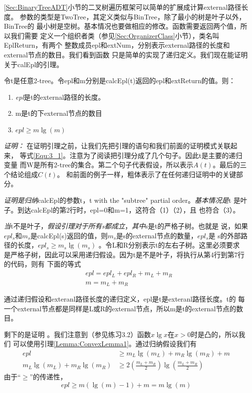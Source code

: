 \ref{Sec:BinaryTreeADT}小节的二叉树遍历框架可以简单的扩展成计算external路径长度。
参数的类型是TwoTree，其定义类似与BinTree，除了最小的树是叶子以外，BinTree的
最小树是空树。基本情况也要做相应的修改。函数需要返回两个值，所以我们需要
定义一个组织者类（参见\ref{Sec:OrganizerClass}小节），类名叫EplReturn，有两个
整数成员epl和extNum，分别表示external路径的长度和external节点的数目。我们看到函数
只是简单的实现了递归定义。我们现在能证明关于calEpl的引理。

\begin{lemma}\label{Lemma:ExternalNodeCount}
令t是任意2-tree。令epl和m分别是calcEpl(t)返回的epl和extReturn的值。则：
\begin{enumerate}
\item \emph{epl}是t的external路径的长度。
\item m是t的下external节点的数目
\item $epl \geq m\lg(m)$
\end{enumerate}

\emph{证明：} 在证明引理之前，让我们先把引理的语句和我们前面的证明模式关联起来，
等式\ref{Equ:3_1}。注意为了阅读把引理分成了几个句子。因此t是主要的递归变量
而W是所有2-tree的集合。第二个句子代表假设，所以表示$A(t)$。最后的三个结论组成$C(t)$。
和前面的例子一样，粗体表示了在任何递归证明中的关键部分。

\emph{证明是归纳}calcEpl的参数t，t with the "subtree" partial order。\emph{基本情况是}t
是叶子。到达calcEpl的第2行时，epl=0和m=1，这符合（1）（2），且 也符合（3）。

\emph{当}t不是叶子，\emph{假设引理对于所有s都成立}，\emph{其中}s是t的严格子树。也就是
说，如果$epl_s$和$m_s$是calcEpl(s)返回的值，则$m_s$是s的external节点的数量，$epl_s$是
s的外部路径的长度，$epl_s\geq m_s\lg(m_s)$ 。令L和R分别表示t的左右子树。这里必须要求
是严格子树，因此可以采用递归假设。因为t是不是叶子，将执行从第4行到第7行的代码，则有
下面的等式
\begin{displaymath}
\begin{aligned}
    &epl= epl_L +epl_R + m_L +m_R\\
    &m=m_L+m_R
\end{aligned}
\end{displaymath}

通过递归假设和exteranl路径长度的递归定义，epl是t是exteranl路径长度。t的
每一个external节点都是同样是L或R的external节点，所以m是t的external节点的数目。

剩下的是证明 。我们注意到（参见练习3.2）函数$x\lg x$在$x>0$时是凸的，所以我们
可以使用引理\ref{Lemma:ConvexLemma1}。通过归纳假设我们有
\begin{displaymath}
\begin{aligned}
epl &\geq m_L\lg(m_L) +m_R\lg(m_R) +m\\
m_L\lg(m_L) + m_R\lg(m_R) &\geq 2(\frac{m_L+m_R}{2})\lg(\frac{m_L+m_R}{2})
\end{aligned}
\end{displaymath}
由于“$\geq$”的传递性，
\begin{displaymath}
epl \geq  m(\lg(m) -1) +m =m\lg(m)
\end{displaymath}
\end{lemma}

